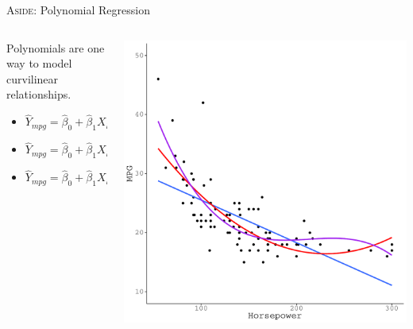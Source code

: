 \documentclass{beamer}\usepackage[]{graphicx}\usepackage[]{color}
\makeatletter
\def\maxwidth{ %
  \ifdim\Gin@nat@width>\linewidth
    \linewidth
  \else
    \Gin@nat@width
  \fi
}
\newenvironment{knitrout}{}{} %
\makeatother
\begin{document}

\begin{frame}{\textsc{Aside}: Polynomial Regression}
  
  \begin{columns}
    \begin{column}{0.5\textwidth}
      Polynomials are one way to model curvilinear relationships.
      \vb
      \begin{itemize}  
      \item {\color{blue}$\hat{Y}_{mpg} = \hat{\beta}_0 + \hat{\beta}_1 X_{hp}$}
        \vb
      \item {\color{red}$\hat{Y}_{mpg} = \hat{\beta}_0 + \hat{\beta}_1 X_{hp} + 
        \hat{\beta}_2 X_{hp}^2$}
        \vb
      \item {\color{violet}$\hat{Y}_{mpg} = \hat{\beta}_0 + \hat{\beta}_1 X_{hp} + 
        \hat{\beta}_2 X_{hp}^2 + \hat{\beta}_3 X_{hp}^3$}
      \end{itemize}
    \end{column}
    
    \begin{column}{0.5\textwidth}
      
\begin{knitrout}\footnotesize
{}\color{fgcolor}

{\centering \includegraphics[width=\maxwidth]{figure/unnamed-chunk-8-1} 

}



\end{knitrout}

\end{column}
\end{columns}

\end{frame}
\end{document}
